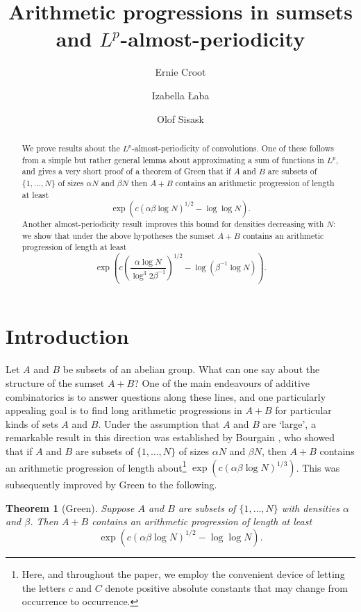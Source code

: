 \documentclass[12pt,a4paper,reqno]{amsart}
\title{Arithmetic progressions in sumsets and $L^p$-almost-periodicity}
\author{Ernie Croot}
\author{Izabella {\L}aba}
\author{Olof Sisask}
\numberwithin{equation}{section}
\theoremstyle{plain}
\newtheorem{theorem}[subsection]{Theorem}
\theoremstyle{definition}
\theoremstyle{plain}
\begin{document}
\begin{abstract}
We prove results about the $L^p$-almost-periodicity of convolutions. One of these follows from a simple but rather general lemma about approximating a sum of functions in $L^p$, and gives a very short proof of a theorem of Green that if $A$ and $B$ are subsets of $\{1,\ldots,N\}$ of sizes $\alpha N$ and $\beta N$ then $A+B$ contains an arithmetic progression of length at least
\[ \exp\left( c (\alpha \beta \log N)^{1/2} - \log\log N \right). \]
Another almost-periodicity result improves this bound for densities decreasing with $N$: we show that under the above hypotheses the sumset $A+B$ contains an arithmetic progression of length at least
\[ \exp\left( c \left(\frac{\alpha \log N}{\log^3 2\beta^{-1}} \right)^{1/2} - \log( \beta^{-1} \log N) \right). \]
\end{abstract}

\maketitle


\parindent 0mm
\parskip   4mm

\section{Introduction}
Let $A$ and $B$ be subsets of an abelian group. What can one say about the structure of the sumset $A+B$? One of the main endeavours of additive combinatorics is to answer questions along these lines, and one particularly appealing goal is to find long arithmetic progressions in $A+B$ for particular kinds of sets $A$ and $B$. Under the assumption that $A$ and $B$ are `large', a remarkable result in this direction was established by Bourgain \cite{bourgain:longAPs}, who showed that if $A$ and $B$ are subsets of $\{1,\ldots,N\}$ of sizes $\alpha N$ and $\beta N$, then $A+B$ contains an arithmetic progression of length about\footnote{Here, and throughout the paper, we employ the convenient device of letting the letters $c$ and $C$ denote positive absolute constants that may change from occurrence to occurrence.} $\exp( c (\alpha \beta \log N)^{1/3})$. This was subsequently improved by Green \cite{green:longAPs} to the following.

\begin{theorem}[Green]\label{thm:green}
Suppose $A$ and $B$ are subsets of $\{1,\ldots,N\}$ with densities $\alpha$ and $\beta$. Then $A+B$ contains an arithmetic progression of length at least
\[ \exp\left( c (\alpha \beta \log N)^{1/2} - \log\log N\right). \]
\end{theorem} 
\end{document}
